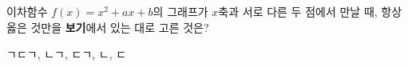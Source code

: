 이차함수 $f(x)=x^2+ax+b$의 그래프가 $x$축과 서로 다른 두 점에서 만날 때, 항상 옳은 것만을 \textbf{보기}에서 있는 대로 고른 것은?  
\begin{choices32}{ㄱ}{ㄷ}{ㄱ, ㄴ}{ㄱ, ㄷ}{ㄱ, ㄴ, ㄷ}\end{choices32}
